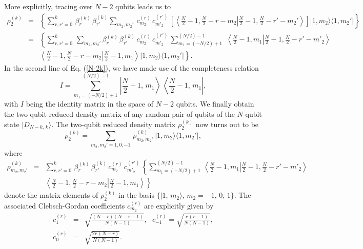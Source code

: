 \documentclass[pra,a4paper,showpacs,superscriptaddress]{revtex4}
\newcommand{\be}{\begin{equation}}
\newcommand{\ee}{\end{equation}}
\begin{document}
More explicitly, tracing over $N-2$ qubits leads us to 
\begin{eqnarray}
\label{N-2k}
\rho^{(k)}_2&=&\left\{\sum_{r,r'=0}^k\, \beta^{(k)}_r\, \beta^{(k)}_{r'} \sum_{m_2,m_2'}\,c_{m_2}^{(r)}\, 
c_{m'_2}^{(r')}\,
\left[\left\langle\frac{N}{2}-1,\frac{N}{2}-r-m_2 \right\vert\left.\frac{N}{2}-1,\frac{N}{2}-r'-m_2'\right\rangle \right] \vert 1, m_2\rangle \langle 1, m_2'\vert   \right\} \nonumber \\
&=&\left\{\sum_{r,r'=0}^k\,\sum_{m_2,m_2'} \beta^{(k)}_r\, \beta^{(k)}_{r'} \,c_{m_2}^{(r)}\, 
c_{m'_2}^{(r')}\,\sum_{m_1=(-N/2)+1}^{(N/2)-1}\,\, \left\langle \frac{N}{2}-1, m_1    \right\vert \left.\frac{N}{2}-1,\frac{N}{2}-r'-m'_2 \right\rangle \right.\, \nonumber \\ 
& & \left. \left. \left\langle \frac{N}{2}-1,\frac{N}{2}-r-m_2 \right\vert \frac{N}{2}-1, m_1 \right\rangle 
\vert 1, m_2\rangle \langle 1, m_2'\vert   \right\}.
\end{eqnarray}
In the second line of Eq. (\ref{N-2k}), we have made use of the completeness relation 
\[
I=\sum_{m_1=(-N/2)+1}^{(N/2)-1}\, \left\vert \frac{N}{2}-1,\,m_1 \right\rangle\,\left\langle \frac{N}{2}-1,\,m_1 \right\vert,
\]  
with $I$ being the identity matrix in the space of $N-2$ qubits. We finally obtain the two qubit reduced density matrix of any random pair of qubits of the $N$-qubit state $\vert D_{N-k,\,k}\rangle$. The two-qubit reduced density matrix $\rho^{(k)}_2$ now turns out to be 
\be
\label{finalrhok}
\rho^{(k)}_2=\sum_{m_2,m_2'=1,0,-1}\, \rho^{(k)}_{m_2,m_2'}\,  \vert 1, m_2\rangle \langle 1, m_2'\vert,  
\ee
where 
\begin{eqnarray}
\label{rhok}
\rho^{(k)}_{m_2,m_2'}&=&\sum_{r,r'=0}^k\, \beta^{(k)}_r\, \beta^{(k)}_{r'}\, c_{m_2}^{(r)}\,c_{m'_2}^{(r')}\,\left\{ \sum_{m_1=(-N/2)+1}^{(N/2)-1}\, \left\langle \frac{N}{2}-1, m_1    \right\vert \left.\frac{N}{2}-1,\frac{N}{2}-r'-m'_2 \right\rangle \right. \nonumber \\
 & & \left.
\left\langle \frac{N}{2}-1,\frac{N}{2}-r-m_2   \right\vert \left. \frac{N}{2}-1, m_1\right\rangle \right\}
\end{eqnarray} 
denote the matrix elements of $\rho^{(k)}_2$ in the basis $\{\vert 1,\,m_2\rangle,\, m_2=-1,\,0,\,1\}$. 
The associated Clebsch-Gordan coefficients $c^{(r)}_{m_2}$ are explicitly given by~\cite{Var}
\begin{eqnarray}
\label{cg_explicit}
c^{(r)}_{1}&=&\sqrt{\frac{(N-r)(N-r-1)}{N(N-1)}},\ \ \ c^{(r)}_{-1}=\sqrt{\frac{r\, (r-1)}{N(N-1)}},\nonumber \\
c^{(r)}_{0}&=&\sqrt{\frac{2r\, (N-r)}{N(N-1)}}.	  
\end{eqnarray} 
\end{document}
